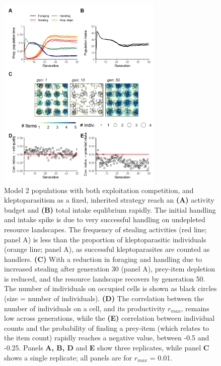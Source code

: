 \documentclass[11pt]{article}
\begin{document}
\begin{figure}[h!]
    \centering
    \includegraphics[width=0.70\textwidth]{figures/fig_03.png}
    \caption{
        Model 2 populations with both exploitation competition, and kleptoparasitism as a fixed, inherited strategy reach an \textbf{(A)} activity budget and \textbf{(B)} total intake equlibrium rapidly.
        The initial handling and intake spike is due to very successful handling on undepleted resource landscapes.
        The frequency of stealing activities (red line; panel A) is less than the proportion of kleptoparasitic individuals (orange line; panel A), as successful kleptoparasites are counted as handlers.
        \textbf{(C)} With a reduction in foraging and handling due to increased stealing after generation 30 (panel A), prey-item depletion is reduced, and the resource landscape recovers by generation 50.
        The number of individuals on occupied cells is shown as black circles (size = number of individuals). 
        \textbf{(D)} The correlation between the number of individuals on a cell, and its productivity $r_{max}$, remains low across generations, while the 
        \textbf{(E)} correlation between individual counts and the probability of finding a prey-item (which relates to the item count) rapidly reaches a negative value, between -0.5 and -0.25.
        Panels \textbf{A, B, D} and \textbf{E} show three replicates, while panel \textbf{C} shows a single replicate; all panels are for $r_{max}$ = 0.01.
    }
    \label{Fig:Model2}
\end{figure}
\end{document}
